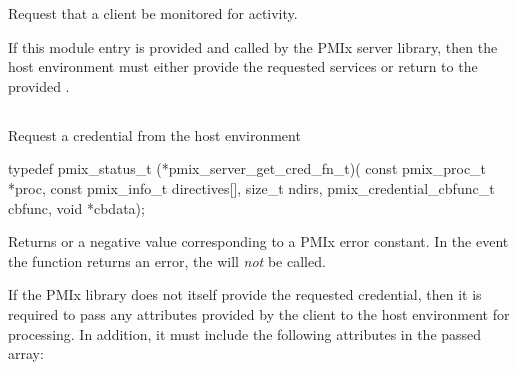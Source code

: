 \optattrend

\descr

Request that a client be monitored for activity.

\advicermstart
If this module entry is provided and called by the \ac{PMIx} server library, then the host environment must either provide the requested services or return  to the provided .
\advicermend

\subsection{}

\summary

Request a credential from the host environment

\format

\cspecificstart
\begin{codepar}
typedef pmix_status_t (*pmix_server_get_cred_fn_t)(
                             const pmix_proc_t *proc,
                             const pmix_info_t directives[],
                             size_t ndirs,
                             pmix_credential_cbfunc_t cbfunc,
                             void *cbdata);
\end{codepar}
\cspecificend

\begin{arglist}
\end{arglist}

Returns  or a negative value corresponding to a PMIx error constant. In the event the function returns an error, the  will \textit{not} be called.

\reqattrstart
If the \ac{PMIx} library does not itself provide the requested credential, then it is required to pass any attributes provided by the client to the host environment for processing. In addition, it must include the following attributes in the passed  array:

